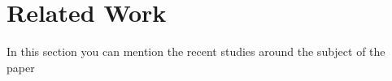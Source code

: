 \section{Related Work}
In this section you can mention the recent studies around the subject of the paper 


